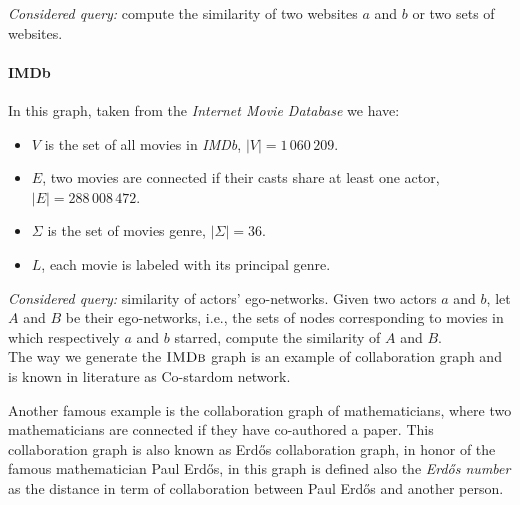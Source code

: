     
    \textsl{Considered query:} compute the similarity of two websites $a$ and $b$ or two sets of websites.
    
    \paragraph*{IMDb} In this graph, taken from the \textit{Internet Movie Database}\cite{imdb} we have:
    
    \begin{itemize}
    	\item $V$ is the set of all movies in \textit{IMDb},  $|V| = 1\,060\,209$.
		\item $E$, two movies are connected if their casts share at least one actor, $|E| = 288\,008\,472$.
		\item $\Sigma$ is the set of movies genre, $|\Sigma| = 36$.
		\item $L$, each movie is labeled with its principal genre.
    \end{itemize}
    
    
    \textsl{Considered query:} similarity of actors' ego-networks. Given two actors $a$ and $b$, let $A$ and $B$ be their ego-networks, i.e., the sets of nodes corresponding to movies in which respectively $a$ and $b$ starred, compute the similarity of $A$ and $B$.\\
    
    The way we generate the $\textsc{IMDb}$ graph is an example of collaboration graph and is known in literature as Co-stardom network. 
    
    Another famous example is the collaboration graph of mathematicians, where two mathematicians are connected if they have co-authored a paper. 
    This collaboration graph is also known as Erdős collaboration graph\cite{BATAGELJ2000173}, in honor of the famous mathematician Paul Erdős, in this graph is defined also the \textit{Erdős number} as the distance in term of collaboration between Paul Erdős and another person.
    
